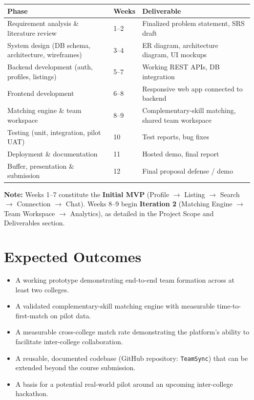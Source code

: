 \documentclass[11pt]{article}
\begin{document}
\begin{center}
\begin{tabular}{|p{4.3cm}|p{1.6cm}|p{6.3cm}|}
\hline
\textbf{Phase} & \textbf{Weeks} & \textbf{Deliverable} \\
\hline
Requirement analysis \& literature review & 1--2 & Finalized problem statement, SRS draft \\
\hline
System design (DB schema, architecture, wireframes) & 3--4 & ER diagram, architecture diagram, UI mockups \\
\hline
Backend development (auth, profiles, listings) & 5--7 & Working REST APIs, DB integration \\
\hline
Frontend development & 6--8 & Responsive web app connected to backend \\
\hline
Matching engine \& team workspace & 8--9 & Complementary-skill matching, shared team workspace \\
\hline
Testing (unit, integration, pilot UAT) & 10 & Test reports, bug fixes \\
\hline
Deployment \& documentation & 11 & Hosted demo, final report \\
\hline
Buffer, presentation \& submission & 12 & Final proposal defense / demo \\
\hline
\end{tabular}
\end{center}

\noindent\textbf{Note:} Weeks 1--7 constitute the \textbf{Initial MVP} (Profile $\rightarrow$
Listing $\rightarrow$ Search $\rightarrow$ Connection $\rightarrow$ Chat). Weeks 8--9 begin
\textbf{Iteration 2} (Matching Engine $\rightarrow$ Team Workspace $\rightarrow$ Analytics), as
detailed in the Project Scope and Deliverables section.

\section{Expected Outcomes}
\begin{itemize}[leftmargin=*]
  \item A working prototype demonstrating end-to-end team formation across at least two
  colleges.
  \item A validated complementary-skill matching engine with measurable time-to-first-match on
  pilot data.
  \item A measurable cross-college match rate demonstrating the platform's ability to facilitate
  inter-college collaboration.
  \item A reusable, documented codebase (GitHub repository: \texttt{TeamSync}) that can be
  extended beyond the course submission.
  \item A basis for a potential real-world pilot around an upcoming inter-college hackathon.
\end{itemize}
\end{document}
